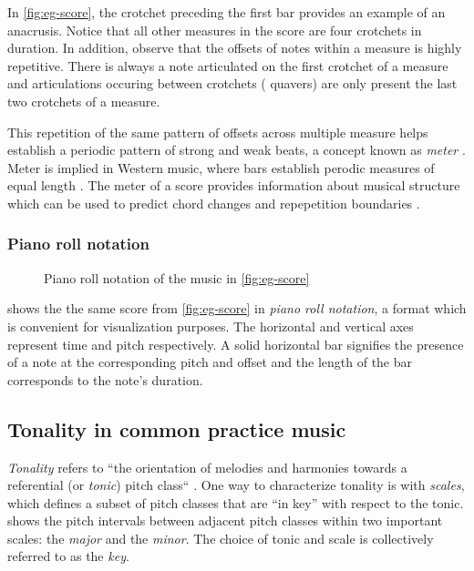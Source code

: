 In \vref{fig:eg-score}, the crotchet preceding the first bar provides an
example of an anacrusis. Notice that all other measures in the score are four
crotchets in duration. In addition, observe that the offsets of notes within a
measure is highly repetitive. There is always a note articulated on the first
crotchet of a measure and articulations occuring between crotchets (\ie
quavers) are only present the last two crotchets of a measure.

This repetition of the same pattern of offsets across multiple measure helps
establish a periodic pattern of strong and weak beats, a concept known as
\emph{meter} \cite{grove-meter}. Meter is implied in Western music, where bars
establish perodic measures of equal length \citep{handel1993listening}. The
meter of a score provides information about musical structure which can be used
to predict chord changes and repepetition boundaries
\citep{cooper1963rhythmic}.

\subsubsection{Piano roll notation}

\begin{figure}[tb]
    \centering
    
    \caption{Piano roll notation of the music in \cref{fig:eg-score}}
    \label{fig:eg-piano-roll}
\end{figure}

 shows the the same score from
\vref{fig:eg-score} in \emph{piano roll notation}, a format which is convenient
for visualization purposes. The horizontal and vertical axes represent time and
pitch respectively. A solid horizontal bar signifies the presence of a note at
the corresponding pitch and offset and the length of the bar corresponds to the
note's duration.

\subsection{Tonality in common practice music}

\emph{Tonality} refers to ``the orientation of melodies and harmonies towards a
referential (or \emph{tonic}) pitch class`` \citep{grove-tonality}. One way to
characterize tonality is with \emph{scales}, which defines a subset of pitch
classes that are ``in key'' with respect to the tonic. 
shows the pitch intervals between adjacent pitch classes within two important
scales: the \emph{major} and the \emph{minor}. The choice of tonic and scale is
collectively referred to as the \emph{key}.

